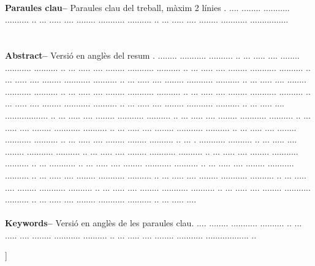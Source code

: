 \documentclass[10pt,a4paper,twocolumn,twoside]{article}
\begin{document}
\begin{@twocolumnfalse}
\begin{center}
{\\
\textbf{Paraules clau-- } Paraules clau del treball, màxim 2 línies . .... ........ ........... .......... ..  ... ..... .... ........ ........... .......... ..  ... ..... .... ........ ........... ................\\
\\
\bigskip
\\
\textbf{Abstract--} Versió en anglès del resum . ........ ........... .......... ..  ... ..... .... ........ ........... .......... ..  ... ..... .... ........ ........... .......... ..  ... ..... .... ........ ........... .......... ..  ... ..... .... ........ ........... .......... ..  ... ..... .... ........ ........... .......... ..  ... ..... .... ........ ........... .......... ..  ... ..... .... ........ ........... .......... ..  ... ..... .... ........ ........... .......... ..  ... ..... .... ........ ........... .......... ..  ... ..... .... ........ ........... .......... ..  ... ..... .... .................. ..  ... ..... .... ........ ........... .......... ..  ... ..... .... ........ ........... .......... ..  ... ..... .... ........ ........... .......... ..  ... ..... .... ........ ........... .......... ..  ... ..... .... ........ ........... .......... ..  ... ..... .... ........ ........ .......... ..  ... . ........... .......... ..  ... ..... .... ........ ........... .......... ..  ... ..... .... ........ ........... .......... ..  ... ..... .... ........ ........... .......... ..  ... ........... ..  ... ..... .... ........ ........... .......... ..  ... ..... .... ........ ........... .......... ..  ... ..... .... ........ ........... .......... ..  ... ..... .... ........ ........... .......... ..  ... ..... .... ........ ........... .......... ..  ... ..... .... ........ ........... .......... ..  ... ..... .... ........ ........... .......... ..  ... ..... .... ........ ........... .......... ..  ... ..... .... 
\\
\\
\textbf{Keywords-- } Versió en anglès de les paraules clau. .... ........ ........... .......... ..  ... ..... .... ........ ........... .......... ..  ... ..... .... ........ ........... .................. ..\\
}

\bigskip

{\vrule depth 0pt height 0.5pt width 4cm\hspace{7.5pt}%
%
\hspace{7.5pt}\vrule depth 0pt height 0.5pt width 4cm\relax}

\end{center}

\bigskip
\end{@twocolumnfalse}]
\end{document}
